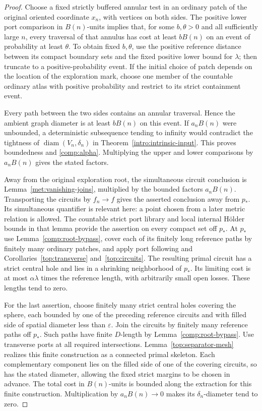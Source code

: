 \documentclass[11pt]{article}
\numberwithin{equation}{section}
\theoremstyle{definition}
\theoremstyle{remark}
\newcommand{\1}{\mathbf 1}
\begin{document}
\begin{proof}
Choose a fixed strictly buffered annular test in an ordinary patch
of the original oriented coordinate $x_n$, with vertices on both
sides.  The positive lower port comparison in
$B(n)$-units implies that, for some $b,\theta>0$ and all sufficiently
large $n$, every traversal of that annulus has cost at least $bB(n)$
on an event of probability at least $\theta$.  To obtain fixed
$b,\theta$, use the positive reference distance between its compact
boundary sets and the fixed positive lower bound for $\lambda$;
then truncate to a positive-probability event.  If the initial
choice of patch depends on the location of the exploration mark,
choose one member of the countable ordinary atlas with positive
probability and restrict to its strict containment event.

Every path between the two sides contains an annular traversal.
Hence the ambient graph diameter is at least $bB(n)$ on this event.
If $a_nB(n)$ were unbounded, a deterministic subsequence tending to
infinity would contradict the tightness of
$\operatorname{diam}(V_n,\delta_n)$ in Theorem~\ref{intro:intrinsic-input}.
This proves boundedness and \eqref{comp:alpha}.  Multiplying the
upper and lower comparisons by $a_nB(n)$ gives the stated factors.

Away from the original exploration root, the simultaneous circuit
conclusion is Lemma~\ref{met:vanishing-joins}, multiplied by the
bounded factors $a_nB(n)$.  Transporting the circuits by $f_n\to f$
gives the asserted conclusion away from $p_*$.  Its simultaneous
quantifier is relevant here: a point
chosen from a later metric relation is allowed.  The countable
strict port library and local internal H\"older bounds in that
lemma provide the assertion on every compact set off $p_*$.  At
$p_*$ use Lemma~\ref{comp:root-bypass}, cover each of its finitely
long reference paths by finitely many ordinary patches, and apply
port following and Corollaries~\ref{top:transverse} and~\ref{top:circuits}.
The resulting primal circuit has a strict central hole and lies in
a shrinking neighborhood of $p_*$.  Its limiting cost is at most
$\alpha\lambda$ times the reference length, with arbitrarily small
open losses.  These lengths tend to zero.

For the last assertion, choose finitely many strict central holes
covering the sphere, each bounded by one of the preceding reference
circuits and with filled side of spatial diameter less than
$\varepsilon$.  Join the circuits by finitely many reference paths
off $p_*$.  Such paths have finite $D$-length by
Lemma~\ref{comp:root-bypass}.  Use transverse ports at all required
intersections.  Lemma~\ref{top:separator-mesh} realizes this finite
construction as a connected primal skeleton.  Each complementary
component lies on the filled side of one of the covering circuits,
so has the stated diameter, allowing the fixed strict margins to
be chosen in advance.  The total cost in $B(n)$-units is bounded
along the extraction for this finite construction.  Multiplication
by $a_nB(n)\to0$ makes its $\delta_n$-diameter tend to zero.
\end{proof}
\end{document}

